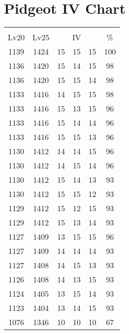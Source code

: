 \documentclass{article}%
\begin{document}
%
\normalsize%
\section{Pidgeot IV Chart}%
\label{sec:Pidgeot IV Chart}%
\renewcommand{\arraystretch}{1.5}%
\begin{tabular}{|c|c|c|c|c|c|}%
\hline%
\multicolumn{6}{|c|}{\textcolor{white}{ 
\linebreak{Pidgeot}
}%
\cellcolor{black}}\\%
\multicolumn{1}{|c}{Lv20}&\multicolumn{1}{c|}{Lv25}&\multicolumn{3}{c|}{IV}&\multicolumn{1}{|c|}{\%}\\%
\hline%
\rowcolor{color100}%
1139&1424&15&15&15&100\\%
\hline%
\rowcolor{color98}%
1136&1420&15&14&15&98\\%
\hline%
\rowcolor{color98}%
1136&1420&15&15&14&98\\%
\hline%
\rowcolor{color98}%
1133&1416&14&15&15&98\\%
\hline%
\rowcolor{color96}%
1133&1416&15&13&15&96\\%
\hline%
\rowcolor{color96}%
1133&1416&15&14&14&96\\%
\hline%
\rowcolor{color96}%
1133&1416&15&15&13&96\\%
\hline%
\rowcolor{color96}%
1130&1412&14&14&15&96\\%
\hline%
\rowcolor{color96}%
1130&1412&14&15&14&96\\%
\hline%
\rowcolor{color93}%
1130&1412&15&14&13&93\\%
\hline%
\rowcolor{color93}%
1130&1412&15&15&12&93\\%
\hline%
\rowcolor{color93}%
1129&1412&15&12&15&93\\%
\hline%
\rowcolor{color93}%
1129&1412&15&13&14&93\\%
\hline%
\rowcolor{color96}%
1127&1409&13&15&15&96\\%
\hline%
\rowcolor{color93}%
1127&1409&14&14&14&93\\%
\hline%
\rowcolor{color93}%
1127&1408&14&15&13&93\\%
\hline%
\rowcolor{color93}%
1126&1408&14&13&15&93\\%
\hline%
\rowcolor{color93}%
1124&1405&13&15&14&93\\%
\hline%
\rowcolor{color93}%
1123&1404&13&14&15&93\\%
\hline%
\rowcolor{color91}%
1076&1346&10&10&10&67\\%
\end{tabular}

%
\end{document}
